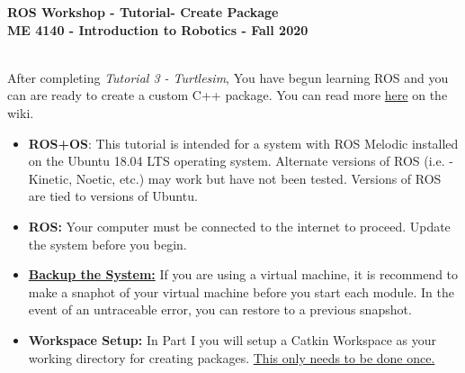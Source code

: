 \documentclass[12pt]{article}
\newcommand{\MNUM}{3} %
\newcommand{\MNAME}{Create Package} %
\begin{document}
\thispagestyle{plain}

\begin{center}
   {\bf \Large ROS Workshop - Tutorial\hspc\MNUM\hspc - \MNAME}\vspace{3mm}\\
   {\bf \large ME 4140 - Introduction to Robotics - Fall 2020} \vspace{5mm}\\
\end{center}

\begin{description}[labelindent=1cm]
	
	\item[\textbf{\underline{Overview:}}] \hfill \vspace{3mm}\\
	After completing {\it Tutorial 3 - Turtlesim}, You have begun learning ROS and you can are ready to create a custom C++ package. You can read more \href{http://wiki.ros.org/catkin/Tutorials/create_a_workspace}{here} on the wiki.
	
	\item[\textbf{\underline{System Requirements:}}] \hfill \vspace{0mm}

\begin{itemize}
	\item {\bf ROS+OS}: This tutorial is intended for a system with ROS Melodic installed on the Ubuntu 18.04 LTS operating system. Alternate versions of ROS (i.e. - Kinetic, Noetic, etc.) may work but have not been tested. Versions of ROS are tied to versions of Ubuntu.
	\item {\bf ROS:} Your computer must be connected to the internet to proceed. Update the system before you begin.
\end{itemize}

	
	\item[\textbf{\underline{Disclaimer:}}] \hfill \vspace{0mm}
	
	\begin{itemize}

		\item {\R\underline{\bf Backup the System:}} If you are using a virtual machine, it is recommend to make a snaphot of your virtual machine before you start each module. In the event of an untraceable error, you can restore to a previous snapshot. 
		
		\item {\bf Workspace Setup:} In Part I you will setup a Catkin Workspace as your working directory for creating packages. {\G \underline {This only needs to be done once.}}  
	\end{itemize}


\end{description}
\end{document}
